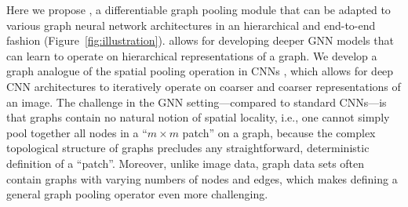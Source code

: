

Here we propose \name, a differentiable graph pooling module that can be adapted to various graph neural network architectures in an hierarchical and end-to-end fashion (Figure~\ref{fig:illustration}). 
\name allows for developing deeper GNN models that can learn to operate on hierarchical representations of a graph. We develop a graph analogue of the spatial pooling operation in CNNs \cite{krizhevsky2012imagenet}, which allows for deep CNN architectures to iteratively operate on coarser and coarser representations of an image. The challenge in the GNN setting---compared to standard CNNs---is that graphs contain no natural notion of spatial locality, i.e., one cannot simply pool together all nodes in a ``$m \times m$ patch'' on a graph, because the complex topological structure of graphs precludes any straightforward, deterministic definition of a ``patch''. Moreover, unlike image data, graph data sets often contain graphs with varying numbers of nodes and edges, which makes defining a general graph pooling operator even more challenging.


